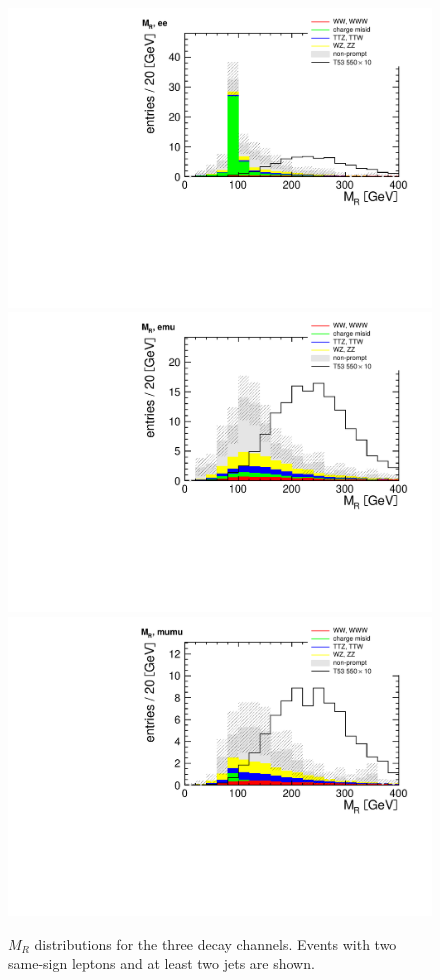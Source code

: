 \begin{figure}[htb]
    \centering
    \includegraphics[width=.7\textwidth]{images/pdf/mr_ee_0}
    \includegraphics[width=.7\textwidth]{images/pdf/mr_emu_0}
    \includegraphics[width=.7\textwidth]{images/pdf/mr_mumu_0}
    \caption{$M_R$ distributions for the three decay channels. Events with two same-sign leptons and at least
two jets are shown.}
    \label{fig:mr_nobtag_app}
\end{figure}

